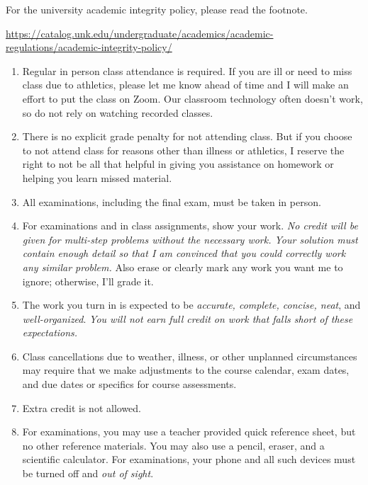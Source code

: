 \documentclass[12pt]{article}
\newcounter{ex}\setcounter{ex}{0}
\begin{document}
For the university academic integrity policy, please read the footnote.{\small  \url{https://catalog.unk.edu/undergraduate/academics/academic-regulations/academic-integrity-policy/}
 

\begin{enumerate}

\item Regular in person class attendance is required. If you are ill or need to miss 
class due to athletics, please let me know ahead of time and I will make an effort to put the class on Zoom. 
Our classroom technology often doesn't work, so do not rely on watching recorded classes.

\item There is no explicit grade penalty for not attending class. But if you choose to not attend class for reasons other
than illness or athletics, I reserve the right to not be all that helpful in giving you assistance on homework or helping 
you learn missed material.

\item All examinations, including the final exam, must be taken in person.

\item For examinations and in class assignments, show your work.  \emph{No credit will be given for multi-step problems without the necessary work. Your solution must contain enough detail
so that I am convinced that you could correctly work any similar problem.} Also erase or clearly mark any work you want me to ignore; otherwise,
I'll grade it.  

\item The work you turn in is expected to be \emph{accurate, 
complete, concise, neat}, and \emph{well-organized}.  
\emph{You will not earn full credit on work that falls short of 
these expectations.}

\item Class cancellations due to weather, illness, or other 
unplanned circumstances may require that we make  adjustments
to the course calendar, exam dates, and due dates or specifics for 
course assessments. 


\item Extra credit is not allowed. 



\item For examinations, you may use a teacher provided quick reference sheet, 
but no other reference materials. You may also use a pencil, eraser, 
and a scientific calculator. For examinations, your phone and all such
devices must be turned off and \emph{out of sight}. 


\end{enumerate}}
\end{document}
